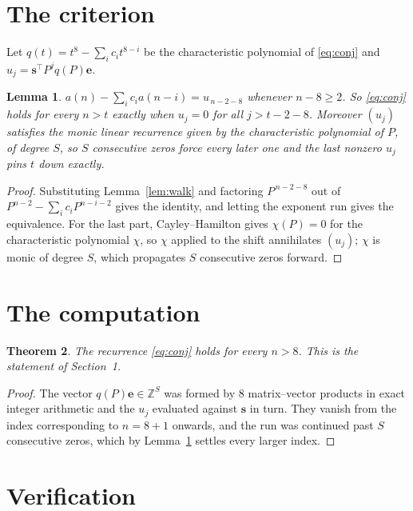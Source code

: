 \documentclass[11pt,a4paper]{article}
\theoremstyle{plain}
\newtheorem{theorem}{Theorem}
\newtheorem{lemma}[theorem]{Lemma}
\theoremstyle{definition}
\begin{document}
\section{The criterion}

Let $q(t)=t^{8}-\sum_i c_i t^{8-i}$ be the characteristic polynomial of
\eqref{eq:conj} and $u_j=\mathbf{s}^{\!\top}P^{j}q(P)\mathbf{e}$.

\begin{lemma}\label{lem:crit}
$a(n)-\sum_i c_i a(n-i)=u_{\,n-2-8}$ whenever $n-8\ge2$. So \eqref{eq:conj}
holds for every $n>t$ exactly when $u_j=0$ for all $j>t-2-8$. Moreover $(u_j)$
satisfies the monic linear recurrence given by the characteristic polynomial of $P$, of
degree $S$, so $S$ consecutive zeros force every later one and the last nonzero $u_j$ pins
$t$ down exactly.
\end{lemma}

\begin{proof}
Substituting Lemma~\ref{lem:walk} and factoring $P^{\,n-2-8}$ out of
$P^{n-2}-\sum_i c_i P^{n-i-2}$ gives the identity, and letting the exponent run gives the
equivalence. For the last part, Cayley--Hamilton gives $\chi(P)=0$ for the characteristic
polynomial $\chi$, so $\chi$ applied to the shift annihilates $(u_j)$; $\chi$ is monic of
degree $S$, which propagates $S$ consecutive zeros forward.
\end{proof}

\section{The computation}

\begin{theorem}
The recurrence \eqref{eq:conj} holds for every $n>8$. This is the statement of
Section~1.
\end{theorem}

\begin{proof}
The vector $q(P)\mathbf{e}\in\mathbb{Z}^{S}$ was formed by $8$ matrix--vector
products in exact integer arithmetic and the $u_j$ evaluated against $\mathbf{s}$ in turn.
They vanish from the index corresponding to $n=8+1$ onwards, and the run was continued
past $S$ consecutive zeros, which by Lemma~\ref{lem:crit} settles every larger index.
\end{proof}

\section{Verification}
\end{document}
